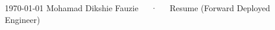 \documentclass[11pt, a4paper]{awesome-cv}
\begin{document}
\makecvheader[C]

\makecvfooter
  {\today}
  {Mohamad Dikshie Fauzie~~~·~~~Resume (Forward Deployed Engineer)}
  {\thepage}





\newpage





\end{document}
